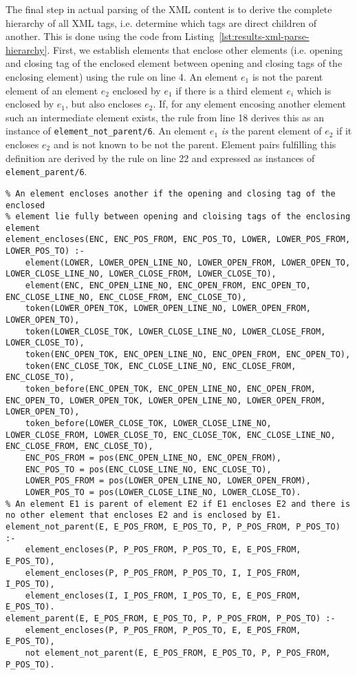 The final step in actual parsing of the XML content is to derive the complete hierarchy of all XML tags, i.e. determine which tags are direct children of another. This is done using the code from Listing~\ref{lst:results-xml-parse-hierarchy}. First, we establish elements that enclose other elements (i.e. opening and closing tag of the enclosed element between opening and closing tags of the enclosing element) using the rule on line 4. An element $e_1$ is not the parent element of an element $e_2$ enclosed by $e_1$ if there is a third element $e_i$ which is enclosed by $e_1$, but also encloses $e_2$. If, for any element encosing another element such an intermediate element exists, the rule from line 18 derives this as an instance of \texttt{element\_not\_parent/6}. An element $e_1$ \emph{is} the parent element of $e_2$ if it encloses $e_2$ and is not known to be not the parent. Element pairs fulfilling this definition are derived by the rule on line 22 and expressed as instances of \texttt{element\_parent/6}.

\begin{lstlisting}[style=asp-code, label={lst:results-xml-parse-hierarchy}, caption={Parsing XML attributes.}]
% Derive parent elements
% An element encloses another if the opening and closing tag of the enclosed 
% element lie fully between opening and cloising tags of the enclosing element
element_encloses(ENC, ENC_POS_FROM, ENC_POS_TO, LOWER, LOWER_POS_FROM, LOWER_POS_TO) :- 
	element(LOWER, LOWER_OPEN_LINE_NO, LOWER_OPEN_FROM, LOWER_OPEN_TO, LOWER_CLOSE_LINE_NO, LOWER_CLOSE_FROM, LOWER_CLOSE_TO),
	element(ENC, ENC_OPEN_LINE_NO, ENC_OPEN_FROM, ENC_OPEN_TO, ENC_CLOSE_LINE_NO, ENC_CLOSE_FROM, ENC_CLOSE_TO),
	token(LOWER_OPEN_TOK, LOWER_OPEN_LINE_NO, LOWER_OPEN_FROM, LOWER_OPEN_TO),
	token(LOWER_CLOSE_TOK, LOWER_CLOSE_LINE_NO, LOWER_CLOSE_FROM, LOWER_CLOSE_TO),
	token(ENC_OPEN_TOK, ENC_OPEN_LINE_NO, ENC_OPEN_FROM, ENC_OPEN_TO),
	token(ENC_CLOSE_TOK, ENC_CLOSE_LINE_NO, ENC_CLOSE_FROM, ENC_CLOSE_TO),
	token_before(ENC_OPEN_TOK, ENC_OPEN_LINE_NO, ENC_OPEN_FROM, ENC_OPEN_TO, LOWER_OPEN_TOK, LOWER_OPEN_LINE_NO, LOWER_OPEN_FROM, LOWER_OPEN_TO),
	token_before(LOWER_CLOSE_TOK, LOWER_CLOSE_LINE_NO, LOWER_CLOSE_FROM, LOWER_CLOSE_TO, ENC_CLOSE_TOK, ENC_CLOSE_LINE_NO, ENC_CLOSE_FROM, ENC_CLOSE_TO),
	ENC_POS_FROM = pos(ENC_OPEN_LINE_NO, ENC_OPEN_FROM),
	ENC_POS_TO = pos(ENC_CLOSE_LINE_NO, ENC_CLOSE_TO),
	LOWER_POS_FROM = pos(LOWER_OPEN_LINE_NO, LOWER_OPEN_FROM),
	LOWER_POS_TO = pos(LOWER_CLOSE_LINE_NO, LOWER_CLOSE_TO).
% An element E1 is parent of element E2 if E1 encloses E2 and there is no other element that encloses E2 and is enclosed by E1.   
element_not_parent(E, E_POS_FROM, E_POS_TO, P, P_POS_FROM, P_POS_TO) :- 
	element_encloses(P, P_POS_FROM, P_POS_TO, E, E_POS_FROM, E_POS_TO),
	element_encloses(P, P_POS_FROM, P_POS_TO, I, I_POS_FROM, I_POS_TO),
	element_encloses(I, I_POS_FROM, I_POS_TO, E, E_POS_FROM, E_POS_TO).
element_parent(E, E_POS_FROM, E_POS_TO, P, P_POS_FROM, P_POS_TO) :- 
	element_encloses(P, P_POS_FROM, P_POS_TO, E, E_POS_FROM, E_POS_TO),
	not element_not_parent(E, E_POS_FROM, E_POS_TO, P, P_POS_FROM, P_POS_TO).
\end{lstlisting}         


